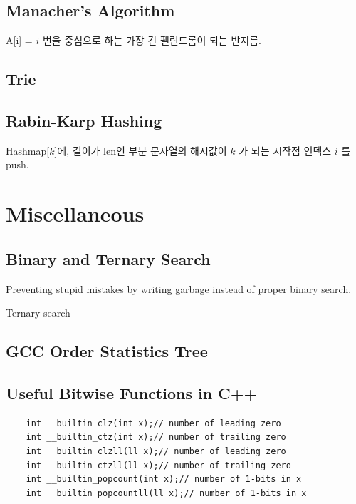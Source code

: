 \documentclass[landscape,8pt]{article}
\begin{document}
\begin{multicols}{2}
  \subsection{Manacher's Algorithm}
    A[i] = $i$ 번을 중심으로 하는 가장 긴 팰린드롬이 되는 반지름.
    
  \subsection{Trie}
    
  \subsection{Rabin-Karp Hashing}
    Hashmap[$k$]에, 길이가 len인 부분 문자열의 해시값이 $k$ 가 되는 시작점 인덱스 $i$ 를 push.
    
\columnbreak

\section{Miscellaneous}
  \subsection{Binary and Ternary Search}
    Preventing stupid mistakes by writing garbage instead of proper binary search.
    
    Ternary search
    
  \subsection{GCC Order Statistics Tree}
    
  \subsection{Useful Bitwise Functions in C++}
  \begin{verbatim}
    int __builtin_clz(int x);// number of leading zero
    int __builtin_ctz(int x);// number of trailing zero
    int __builtin_clzll(ll x);// number of leading zero
    int __builtin_ctzll(ll x);// number of trailing zero
    int __builtin_popcount(int x);// number of 1-bits in x
    int __builtin_popcountll(ll x);// number of 1-bits in x


\end{verbatim}
\end{multicols}
\end{document}
